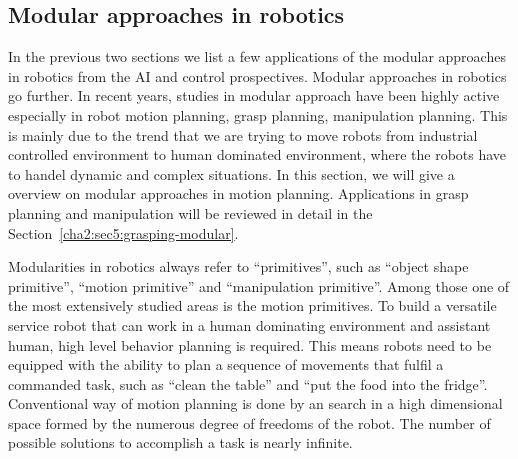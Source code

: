 %
%







\subsection{Modular approaches in robotics}
\label{cha2:sec3:modular:robotics}
In the previous two sections we list a few applications of the modular approaches in robotics from the AI and control prospectives. Modular approaches in robotics go further. In recent years, studies in modular approach have been highly active especially in robot motion planning, grasp planning, manipulation planning. This is mainly due to the trend that we are trying to move robots from industrial controlled environment to human dominated environment, where the robots have to handel dynamic and complex situations. In this section, we will give a overview on modular approaches in motion planning. Applications in grasp planning and manipulation will be reviewed in detail in the Section~\ref{cha2:sec5:grasping-modular}.

Modularities in robotics always refer to ``primitives'', such as ``object shape primitive'', ``motion primitive'' and ``manipulation primitive''. Among those one of the most extensively studied areas is the motion primitives.
To build a versatile service robot that can work in a human dominating environment and assistant human, high level behavior planning is required. This means robots need to be equipped with the ability to plan a sequence of movements that fulfil a commanded task, such as ``clean the table'' and ``put the food into the fridge''. Conventional way of motion planning is done by an search in a high dimensional space formed by the numerous degree of freedoms of the robot. The number of possible solutions to accomplish a task is nearly infinite.

